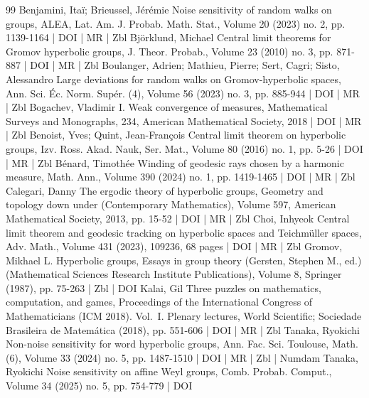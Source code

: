 \documentclass[10pt]{amsart}
\theoremstyle{definition}\newtheorem{defi}[theo]{Definition}\newtheorem{rema}[theo]{Remark}\newtheorem{exam}[theo]{Example}\newtheorem{exem}[theo]{Example}\newtheorem{nota}[theo]{Notation}
\renewcommand{\(}{\left(}
\renewcommand{\)}{\right)}
\begin{document}
\begin{thebibliography}{99}
 Benjamini, Itaï; Brieussel, Jérémie Noise sensitivity of random walks on groups, ALEA, Lat. Am. J. Probab. Math. Stat., Volume 20 (2023) no. 2, pp. 1139-1164 | DOI | MR | Zbl
 Björklund, Michael Central limit theorems for Gromov hyperbolic groups, J. Theor. Probab., Volume 23 (2010) no. 3, pp. 871-887 | DOI | MR | Zbl
 Boulanger, Adrien; Mathieu, Pierre; Sert, Cagri; Sisto, Alessandro Large deviations for random walks on Gromov-hyperbolic spaces, Ann. Sci. Éc. Norm. Supér. (4), Volume 56 (2023) no. 3, pp. 885-944 | DOI | MR | Zbl
 Bogachev, Vladimir I. Weak convergence of measures, Mathematical Surveys and Monographs, 234, American Mathematical Society, 2018 | DOI | MR | Zbl
 Benoist, Yves; Quint, Jean-François Central limit theorem on hyperbolic groups, Izv. Ross. Akad. Nauk, Ser. Mat., Volume 80 (2016) no. 1, pp. 5-26 | DOI | MR | Zbl
 Bénard, Timothée Winding of geodesic rays chosen by a harmonic measure, Math. Ann., Volume 390 (2024) no. 1, pp. 1419-1465 | DOI | MR | Zbl
 Calegari, Danny The ergodic theory of hyperbolic groups, Geometry and topology down under (Contemporary Mathematics), Volume 597, American Mathematical Society, 2013, pp. 15-52 | DOI | MR | Zbl
 Choi, Inhyeok Central limit theorem and geodesic tracking on hyperbolic spaces and Teichmüller spaces, Adv. Math., Volume 431 (2023), 109236, 68 pages | DOI | MR | Zbl
 Gromov, Mikhael L. Hyperbolic groups, Essays in group theory (Gersten, Stephen M., ed.) (Mathematical Sciences Research Institute Publications), Volume 8, Springer (1987), pp. 75-263 | Zbl | DOI
 Kalai, Gil Three puzzles on mathematics, computation, and games, Proceedings of the International Congress of Mathematicians (ICM 2018). Vol. I. Plenary lectures, World Scientific; Sociedade Brasileira de Matemática (2018), pp. 551-606 | DOI | MR | Zbl
 Tanaka, Ryokichi Non-noise sensitivity for word hyperbolic groups, Ann. Fac. Sci. Toulouse, Math. (6), Volume 33 (2024) no. 5, pp. 1487-1510 | DOI | MR | Zbl | Numdam
 Tanaka, Ryokichi Noise sensitivity on affine Weyl groups, Comb. Probab. Comput., Volume 34 (2025) no. 5, pp. 754-779 | DOI
\end{thebibliography}
\end{document}
